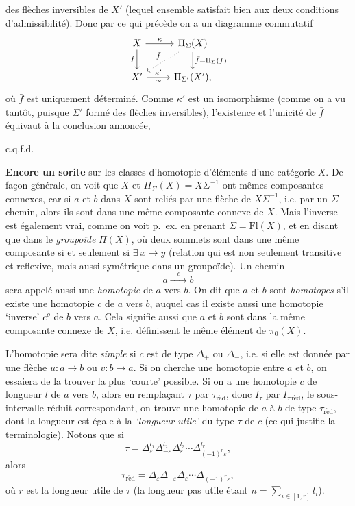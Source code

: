 \documentclass[11pt]{article}
\newcommand{\printedpage}[1]{\marginpar{\footnotesize p.~#1}}
\newcommand{\msp}[1]{\marginpar{\footnotesize [#1]}}
\newcommand{\red}{\mathrm{r\acute{e}d}}
\begin{document}
\setcounter{footnote}{20}

\printedpage{49}
\msp{page 74}
des flèches inversibles de $X'$ (lequel ensemble satisfait bien aux deux conditions d'admissibilité). Donc par ce qui précède on a un diagramme commutatif
\[
\begin{tikzcd}
X \ar[r,"\kappa"] \ar[d,"f"'] & \Pi_{\Sigma}(X) \ar[d,"\bar f = \Pi_{\Sigma}(f)"] \ar[dl,dotted,"\tilde f"'] \\
X' \ar[r,"\kappa'","\sim"'] & \Pi_{\Sigma'}(X'),
\end{tikzcd}
\]
où $\bar f$ est uniquement déterminé. Comme $\kappa'$ est un isomorphisme (comme on a vu tantôt, puisque $\Sigma'$ formé des flèches inversibles), l'existence et l'unicité de $\bar f$ équivaut à la conclusion annoncée,

\hfill c.q.f.d.

\textbf{Encore un sorite} sur les classes d'homotopie d'éléments d'une catégorie $X$. De façon générale, on voit que $X$ et $\Pi_{\Sigma}(X) = X\Sigma^{-1}$ ont mêmes composantes connexes, car si
\msp{page 75}
$a$ et $b$ dans $X$ sont reliés par une flèche de $X\Sigma^{-1}$, i.e. par un $\Sigma$-chemin, alors ils sont dans une même composante connexe de $X$. Mais l'inverse est également vrai, comme on voit p.~ex. en prenant $\Sigma = \mathrm{Fl}(X)$, et en disant que dans le \textit{groupoïde} $\Pi(X)$, où deux sommets sont dans une même composante si et seulement si $\exists\ x \longrightarrow y$ (relation qui est non seulement transitive et reflexive, mais aussi symétrique dans un groupoïde). Un chemin
\[
a \xrightarrow{\quad c \quad} b
\]
sera appelé aussi une \textit{homotopie} de $a$ vers $b$. On dit que $a$ et $b$ sont \textit{homotopes} s'il existe une homotopie $c$ de $a$ vers $b$, auquel cas il existe aussi une homotopie `inverse' $c^{o}$ de $b$ vers $a$. Cela signifie aussi que $a$ et $b$ sont dans la même composante connexe de $X$, i.e. définissent le même élément de $\pi_0(X)$.

L'homotopie sera dite \textit{simple} si $c$ est de type $\Delta_{+}$ ou $\Delta_{-}$, i.e. si elle est donnée par une flèche $u : a \longrightarrow b$ ou $v : b \longrightarrow a$. Si on cherche une homotopie entre $a$ et $b$, on essaiera de la trouver la plus `courte' possible. Si on a une homotopie $c$ de longueur $l$ de $a$ vers $b$, alors en remplaçant $\tau$ par $\tau_{\red}$, donc $I_{\tau}$ par $I_{\tau\,\red}$, le sous-intervalle réduit
\msp{page 76}
correspondant, on trouve une homotopie de $a$ à $b$ de type $\tau_{\red}$, dont la longueur est égale à la \textit{`longueur utile'} du type $\tau$ de $c$ (ce qui justifie la terminologie). Notons que si
\[
\tau = \Delta_{\varepsilon}^{l_1}\Delta_{-\varepsilon}^{l_2}\Delta_{\varepsilon}^{l_3}\cdots\Delta_{(-1)^{r}\varepsilon}^{l_r},
\]
alors
\[
\tau_{\red} = \Delta_{\varepsilon}\Delta_{-\varepsilon}\Delta_{\varepsilon}\cdots\Delta_{(-1)^{r}\varepsilon},
\]
\printedpage{50}
 où $r$ est la longueur utile de $\tau$ (la longueur pas utile étant $n = \sum\limits_{i\in[1,r]} l_i$).
\end{document}

